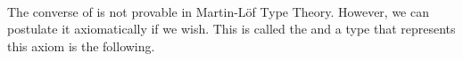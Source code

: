 \ccpad
\begin{code}%
\>[0]\AgdaSpace{}%
\AgdaSymbol{:}\AgdaSpace{}%
\AgdaSymbol{\{}\AgdaSpace{}%
\AgdaSpace{}%
\AgdaSymbol{:}\AgdaSpace{}%
\AgdaSpace{}%
\AgdaSpace{}%
\AgdaSymbol{\}}\AgdaSpace{}%
\AgdaSpace{}%
\AgdaSpace{}%
\AgdaSpace{}%
\AgdaSpace{}%
\AgdaSpace{}%
\AgdaSpace{}%
\AgdaSpace{}%
\<%
\\
\>[0]\AgdaSpace{}%
\AgdaSpace{}%
\AgdaSymbol{=}\AgdaSpace{}%
\AgdaSpace{}%
\AgdaSpace{}%
\AgdaSpace{}%
\AgdaSymbol{)}\AgdaSpace{}%
\AgdaOperator{\AgdaInductiveConstructor{,}}\AgdaSpace{}%
\AgdaSpace{}%
\AgdaSpace{}%
\AgdaSpace{}%
\AgdaSymbol{)}\<%
\end{code}
\ccpad
The converse of  is not provable in Martin-L\"of Type Theory. However, we can postulate it axiomatically if we wish. This is called the  and a type that represents this axiom is the following.
\ccpad
\begin{code}%
\>[0]\AgdaSpace{}%
\AgdaSymbol{:}\AgdaSpace{}%
\AgdaSpace{}%
\AgdaSpace{}%
\AgdaSpace{}%
\AgdaSymbol{(}\AgdaSpace{}%
\AgdaSymbol{:}\AgdaSpace{}%
\AgdaSymbol{)}\AgdaSpace{}%
\AgdaSpace{}%
\AgdaSpace{}%
\AgdaSpace{}%
\AgdaSpace{}%
\AgdaSpace{}%
\<%
\\
\>[0]\AgdaSpace{}%
\AgdaSpace{}%
\AgdaSpace{}%
\AgdaSymbol{=}\AgdaSpace{}%
\AgdaSpace{}%
\AgdaSymbol{(}\AgdaSpace{}%
\AgdaSpace{}%
\AgdaSymbol{:}\AgdaSpace{}%
\AgdaSpace{}%
\AgdaSpace{}%
\AgdaSymbol{)}\AgdaSpace{}%
\AgdaSpace{}%
\AgdaSpace{}%
\AgdaSpace{}%
\AgdaSpace{}%
\AgdaSpace{}%
\AgdaSpace{}%
\AgdaSpace{}%
\<%
\end{code}
